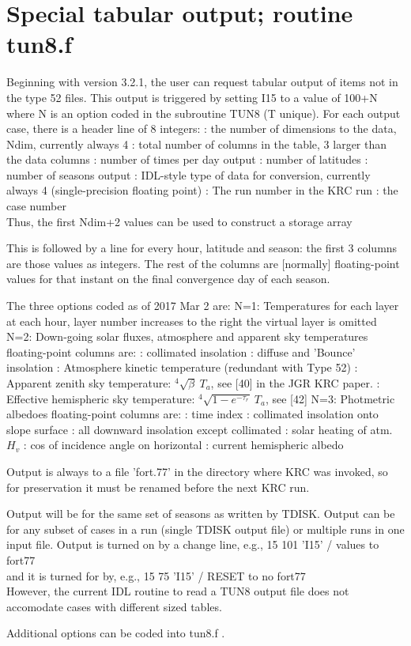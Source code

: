
\section{Special tabular output; routine tun8.f}    %
Beginning with version 3.2.1, the user can request tabular output of items not
in the type 52 files. This output is triggered by setting I15 to a value of
100+N where N is an option coded in the subroutine TUN8 (T unique). For each
output case, there is a header line of 8 integers:
: the number of dimensions to the data, Ndim, currently always 4
: total number of columns in the table, 3 larger than the data columns
: number of times per day output
: number of latitudes
: number of seasons output
: IDL-style type of data for conversion, currently always 4 (single-precision floating point)
: The run number in the KRC run
: the case number
\\ Thus, the first Ndim+2 values can be used to construct a storage array

This is followed by a line for every hour, latitude and season: the first 3
columns are those values as integers. The rest of the columns are [normally]
floating-point values for that instant on the final convergence day of each
season.

The three options coded as of 2017 Mar 2 are:
\qi N=1: Temperatures for each layer at each hour, layer number increases to the right
\qii the virtual layer is omitted
\qi N=2: Down-going solar fluxes, atmosphere and apparent sky temperatures
\qii floating-point columns are: 
: collimated insolation
: diffuse and 'Bounce' insolation 
: Atmosphere kinetic temperature (redundant with Type 52)
: Apparent zenith sky temperature: $^4 \sqrt{ \beta} \ T_a$, see [40] in the JGR KRC paper.
: Effective hemispheric sky temperature:  $^4 \sqrt{1-e^{-\tau_r}} \ T_a$, see [42] 
\qi N=3: Photmetric albedoes
\qii floating-point columns are: 
: time index 
: collimated insolation onto slope surface
: all downward insolation except collimated 
: solar heating of atm. $H_v$ 
: cos of incidence angle on horizontal 
: current hemispheric albedo

Output is always to a file 'fort.77' in the directory where KRC was invoked, so for preservation it must be renamed before the next KRC run. 

Output will be for the same set of seasons as written by TDISK. Output can be
for any subset of cases in a run (single TDISK output file) or multiple runs in
one input file.  Output is turned on by a change line, e.g., 
 15 101 'I15' / values to fort77
\\ and it is turned for by, e.g., 
 15 75 'I15' / RESET to no fort77
\\  However, the current IDL routine to read a TUN8 output file does
not accomodate cases with different sized tables.

Additional options can be coded into tun8.f .
